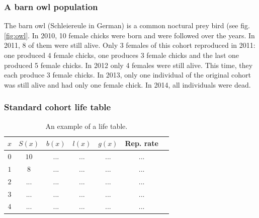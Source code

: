 \documentclass{article}\usepackage[]{graphicx}\usepackage[]{color}
\begin{document}
\subsubsection{A barn owl population}
The barn owl (Schleiereule in German) is a common noctural prey bird (see fig. \ref{fig:owl}. In 2010, 10 female chicks were born and were followed over the years. In 2011, 8 of them were still alive. Only 3 females of this cohort reproduced in 2011: one produced 4 female chicks, one produces 3 female chicks and the last one produced 5 female chicks. In 2012 only 4 females were still alive. This time, they each produce 3 female chicks. In 2013, only one individual of the original cohort was still alive and had only one female chick. In 2014, all individuals were dead.   


\subsubsection{Standard cohort life table}

\begin{table}[h]
\centering
\begin{tabular}{ccccccc}
$x$ & $S(x)$ & $b(x)$ & $l(x)$ & $g(x)$ & Rep. rate \\\hline
$0$ &  $10$ & ... & ... & ...&...\\
$1$ & $8$ & ... & ... & ...&...\\
$2$ & ... & ... & ... & ...&...\\
$3$ & ... & ... & ... & ...&...\\
$4$ & ... & ... & ... & ...&...\\
\end{tabular}
\caption{\label{tab:LT}An example of a life table.}
\end{table}
\end{document}
